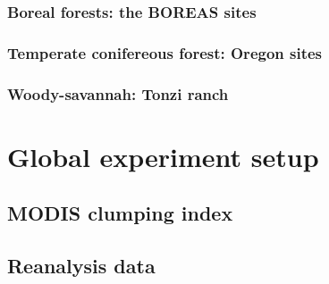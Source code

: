 \documentclass[a4paper,11pt]{report}
\begin{document}
\subsubsection{Boreal forests: the BOREAS sites}

\subsubsection{Temperate conifereous forest: Oregon sites}

\subsubsection{Woody-savannah: Tonzi ranch}

\section{Global experiment setup}

\subsection{MODIS clumping index}

\subsection{Reanalysis data}





%

%

\newpage
\pagestyle{plain}


%
%
\end{document}
